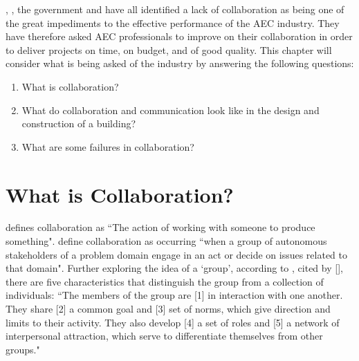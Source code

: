 \cite{Latham1994}, \cite{Egan1998}, the government \citep{GCS11-15, GCS16-20} and \cite{Farmer2016} have all identified a lack of collaboration as being one of the great impediments to the effective performance of the AEC industry.
They have therefore asked AEC professionals to improve on their collaboration in order to deliver projects on time, on budget, and of good quality.
This chapter will consider what is being asked of the industry by answering the following questions:
\begin{enumerate}
	\item What is collaboration?
	\item What do collaboration and communication look like in the design and construction of a building?
	\item What are some failures in collaboration?
\end{enumerate}



\section{What is Collaboration?}

\cite{collabor:oxford} defines collaboration as ``The action of working with someone to produce something".
\cite{wood1991toward} define collaboration as occurring ``when a group of autonomous stakeholders of a problem domain engage in an act or decide on issues related to that domain".
Further exploring the idea of a `group', according to \cite{hare1962handbook}, cited by \citeauthor{lawson1990} [\citeyear[p.~189]{lawson1990}], there are five characteristics that distinguish the group from a collection of individuals:
``The members of the group are [1] in interaction with one another.
They share [2] a common goal and [3] set of norms, which give direction and limits to their activity.
They also develop [4] a set of roles and [5] a network of interpersonal attraction, which serve to differentiate themselves from other groups."

